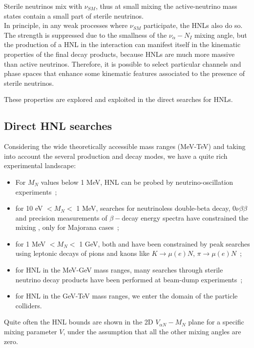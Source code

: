 Sterile neutrinos mix with $\nu_{SM}$, thus at small mixing the
active-neutrino mass states contain a small part of sterile
neutrinos.\\
In principle, in any weak processes where $\nu_{SM}$ participate, the
HNLs also do so. The strength is suppressed due to the smallness of
the $\nu_\alpha - N_I$ mixing angle,
but the production of a HNL in the interaction can manifest itself in the kinematic properties of the final decay products, because HNLs are much more massive than active neutrinos.
Therefore, it is possible to select particular channels and phase spaces that enhance some kinematic features associated to the presence of sterile neutrinos.

These properties are explored and exploited in the direct searches for HNLs.



\subsection{Direct HNL searches}\label{sec:c3directHNL}
Considering the wide theoretically accessible mass ranges (MeV-TeV) and taking into account
the several production and decay modes, we have a quite rich
experimental landscape:
\begin{itemize}
\item For $M_N$ values below 1 MeV, HNL can be probed by
  neutrino-oscillation experiments~\cite{de_Gouv_a_2005};
\item for 10 eV $< M_N <$ 1 MeV, searches for neutrinoless double-beta decay,
  $0\nu\beta\beta$ and precision measurements of $\beta-$decay energy
  spectra have constrained the mixing \mixpare, only for Majorana cases~\cite{Deppisch_2015};
\item for 1 MeV $< M_N <$ 1 GeV, both \mixpare and \mixparm have been
  constrained by peak searches using leptonic decays of pions
  and kaons like $K \rightarrow \mu(e) N$, $\pi \rightarrow \mu(e)
  N$~\cite{Liventsev_2013};
\item for HNL in the MeV-GeV mass ranges, many searches through
  sterile neutrino decay products have been performed at beam-dump experiments~\cite{DORENBOSCH1986473};
\item for HNL in the GeV-TeV mass ranges, we enter the domain of
  the particle colliders.
\end{itemize}

Quite often the HNL bounds are shown in the 2D $V_{\alpha N} -
M_N$ plane for a specific mixing parameter $V$, under the assumption that all the other mixing angles are zero. 

